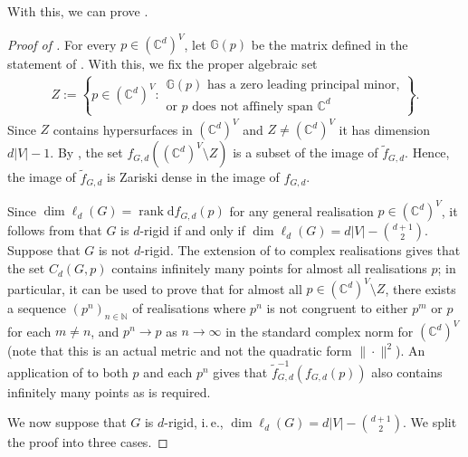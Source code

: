 \documentclass[ALCO]{cedram}
\DeclareMathOperator{\rank}{rank}
\newcommand{\diff}{\mathrm{d}}
\begin{document}
With this, we can prove .


\begin{proof}[Proof of ]
	For every $p \in (\mathbb{C}^d)^V$,
	let $\mathbb{G}(p)$ be the matrix defined in the statement of .
	With this, we fix the proper algebraic set
	\begin{align*}
		Z := \left\{ p \in (\mathbb{C}^d)^V :
			\begin{array}{l}
				\text{$\mathbb{G}(p)$ has a zero leading principal minor,}\\
				\text{or $p$ does not affinely span $\mathbb{C}^d$}
			\end{array}
		 \right\}.
	\end{align*}
	Since $Z$ contains hypersurfaces in $(\mathbb{C}^d)^V$ and $Z \neq (\mathbb{C}^d)^V$
	it has dimension $d|V|-1$.
	By ,
	the set $f_{G,d}((\mathbb{C}^d)^V \setminus Z)$ is a subset of the image of $\tilde{f}_{G,d}$.	
	Hence, the image of $\tilde{f}_{G,d}$ is Zariski dense in the image of $f_{G,d}$.
	
	Since $\dim \ell_d(G) = \rank \diff f_{G,d}(p)$ for any general realisation $p\in (\mathbb{C}^d)^V$,
	it follows from  that $G$ is $d$-rigid if and only if $\dim \ell_d(G) = d|V|- \binom{d+1}{2}$.
	Suppose that $G$ is not $d$-rigid.
	The extension of  to complex realisations gives that the set $C_d(G,p)$ contains infinitely many points for almost all realisations $p$;
	in particular,
	it can be used to prove that for almost all $p \in (\mathbb{C}^d)^V \setminus Z$,
	there exists a sequence $(p^n)_{n \in \mathbb{N}}$ of realisations where $p^n$ is not congruent to either $p^m$ or $p$ for each $m \neq n$, and $p^n \rightarrow p$ as $n \rightarrow \infty$ in the standard complex norm for $(\mathbb{C}^d)^V$ (note that this is an actual metric and not the quadratic form $\| \cdot\|^2$).
	An application of  to both $p$ and each $p^n$ gives that $\tilde{f}_{G,d}^{-1}\left(f_{G,d}(p)\right)$ also contains infinitely many points as is required.
	
	We now suppose that $G$ is $d$-rigid,
	i.\,e., $\dim \ell_d(G) = d|V|- \binom{d+1}{2}$.
	We split the proof into three cases.
	

\end{proof}
\end{document}
